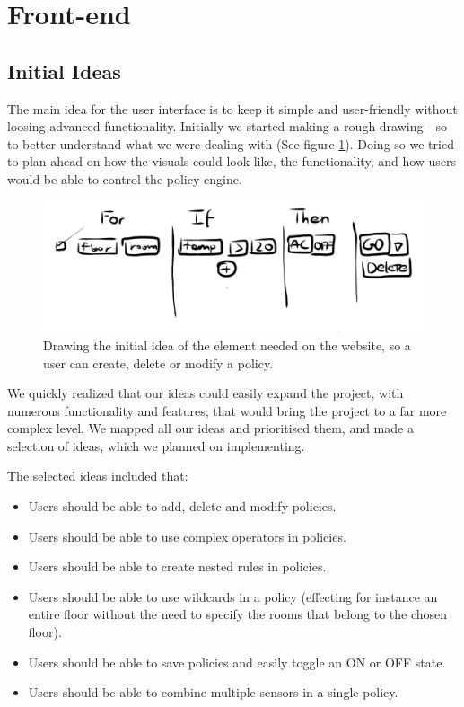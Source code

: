 \section{Front-end}
\label{sec:front-end}
\subsection{Initial Ideas}

The main idea for the user interface is to keep it simple and user-friendly without loosing advanced functionality. Initially we started making a rough drawing - so to better understand what we were dealing with (See figure \ref{fig:initial_idea_frontend}). Doing so we tried to plan ahead on how the visuals could look like, the functionality, and how users would be able to control the policy engine.

\begin{figure}[h!]
\centering
\includegraphics[width=\columnwidth]{initial_idea_frontend.png}
\caption{Drawing the initial idea of the element needed on the website, so a user can create, delete or modify a policy.}
\label{fig:initial_idea_frontend}
\end{figure}

We quickly realized that our ideas could easily expand the project, with numerous functionality and features, that would bring the project to a far more complex level.
We mapped all our ideas and prioritised them, and made a selection of ideas, which we planned on implementing.

The selected ideas included that:
\begin{itemize}
\item Users should be able to add, delete and modify policies.
\item Users should be able to use complex operators in policies.
\item Users should be able to create nested rules in policies.
\item Users should be able to use wildcards in a policy (effecting for instance an entire floor without the need to specify the rooms that belong to the chosen floor).
\item Users should be able to save policies and easily toggle an ON or OFF state.
\item Users should be able to combine multiple sensors in a single policy.
\end{itemize}


